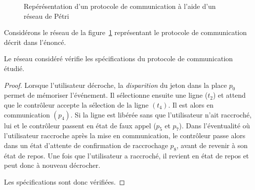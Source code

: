 \begin{figure}
\begin{center}
    \end{center}
    \caption{Repérésentation d'un protocole de communication à l'aide d'un réseau de Pétri}
    \label{fig1_ex2}
\end{figure}
        
Considérons le réseau de la figure~\ref{fig1_ex2} représentant le protocole de communication décrit
dans l'énoncé.
\begin{thrm}
     Le réseau considéré vérifie les spécifications du protocole de communication étudié.
\end{thrm}

\begin{proof}
    Lorsque l'utilisateur décroche, la \emph{disparition} du jeton dans la place $p_0$ permet de
    mémoriser l'événement. Il sélectionne ensuite une ligne ($t_2$) et attend que le contrôleur
    accepte la sélection de la ligne $(t_4)$. Il est alors en communication $(p_4)$. Si la ligne est
    libérée sans que l'utilisateur n'ait raccroché, lui et le contrôleur passent en état de faux
    appel ($p_5$ et $p_7$). Dans l'éventualité où l'utilisateur raccroche après la mise en
    communication, le contrôleur passe alors dans un état d'attente de confirmation de raccrochage
    $p_8$, avant de revenir à son état de repos.
    Une fois que l'utilisateur a raccroché, il revient en état de repos et peut donc à nouveau
    décrocher.

    Les spécifications sont donc vérifiées.
\end{proof}

